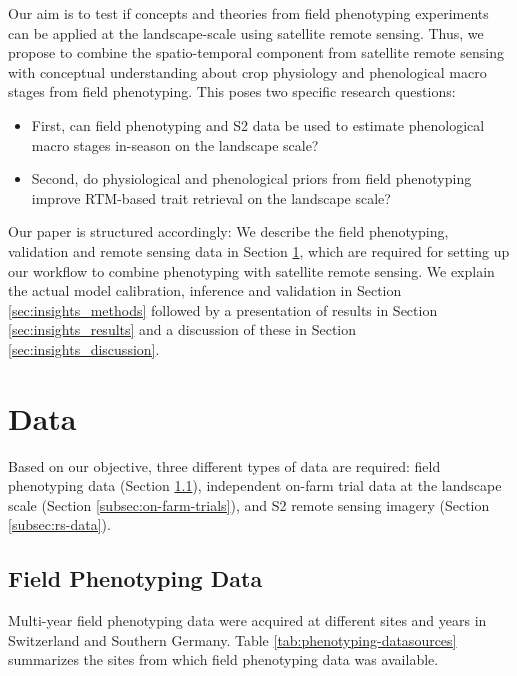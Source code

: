 Our aim is to test if concepts and theories from field phenotyping experiments can be applied at the landscape-scale using satellite remote sensing. Thus, we propose to combine the spatio-temporal component from satellite remote sensing with conceptual understanding about crop physiology and phenological macro stages from field phenotyping. This poses two specific research questions: 
\begin{itemize}
\item First, can field phenotyping and \gls{S2} data be used to estimate phenological macro stages in-season on the landscape scale?
\item Second, do physiological and phenological priors from field phenotyping improve RTM-based trait retrieval on the landscape scale? 
\end{itemize}
Our paper is structured accordingly: We describe the field phenotyping, validation and remote sensing data in Section \ref{sec:data}, which are required for setting up our workflow to combine phenotyping with satellite remote sensing. We explain the actual model calibration, inference and validation in Section \ref{sec:insights_methods} followed by a presentation of results in Section \ref{sec:insights_results} and a discussion of these in Section \ref{sec:insights_discussion}.


\section{Data}
\label{sec:data}
Based on our objective, three different types of data are required: field phenotyping data (Section \ref{subsec:phenotyping-data}), independent on-farm trial data at the landscape scale (Section \ref{subsec:on-farm-trials}), and \gls{S2} remote sensing imagery (Section \ref{subsec:rs-data}).

\subsection{Field Phenotyping Data}
\label{subsec:phenotyping-data}
Multi-year field phenotyping data were acquired at different sites and years in Switzerland and Southern Germany. Table \ref{tab:phenotyping-datasources} summarizes the sites from which field phenotyping data was available.

